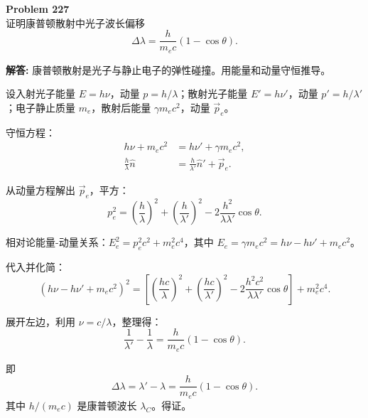 \documentclass[12pt, a4paper, oneside]{ctexart}
\newenvironment{solution}{\par\noindent\textbf{解答:}\quad}{\par}
\begin{document}
\begin{mdframed}[backgroundcolor=gray!10, linewidth=0pt]
    \textbf{Problem 227} \\
    证明康普顿散射中光子波长偏移
    \[
    \Delta\lambda = \frac{h}{m_e c} (1 - \cos\theta).
    \]
\end{mdframed}
\begin{solution}
    康普顿散射是光子与静止电子的弹性碰撞。用能量和动量守恒推导。
    
    设入射光子能量 $E = h\nu$，动量 $p = h/\lambda$；散射光子能量 $E' = h\nu'$，动量 $p' = h/\lambda'$；电子静止质量 $m_e$，散射后能量 $\gamma m_e c^2$，动量 $\vec{p}_e$。
    
    守恒方程：
    \begin{align}
        h\nu + m_e c^2 &= h\nu' + \gamma m_e c^2, \\
        \frac{h}{\lambda} \hat{n} &= \frac{h}{\lambda'} \hat{n}' + \vec{p}_e.
    \end{align}
    
    从动量方程解出 $\vec{p}_e$，平方：
    \[
    p_e^2 = \left( \frac{h}{\lambda} \right)^2 + \left( \frac{h}{\lambda'} \right)^2 - 2 \frac{h^2}{\lambda\lambda'} \cos\theta.
    \]
    
    相对论能量-动量关系：$E_e^2 = p_e^2 c^2 + m_e^2 c^4$，其中 $E_e = \gamma m_e c^2 = h\nu - h\nu' + m_e c^2$。
    
    代入并化简：
    \[
    (h\nu - h\nu' + m_e c^2)^2 = \left[ \left( \frac{hc}{\lambda} \right)^2 + \left( \frac{hc}{\lambda'} \right)^2 - 2 \frac{h^2 c^2}{\lambda\lambda'} \cos\theta \right] + m_e^2 c^4.
    \]
    
    展开左边，利用 $\nu = c/\lambda$，整理得：
    \[
    \frac{1}{\lambda'} - \frac{1}{\lambda} = \frac{h}{m_e c} (1 - \cos\theta).
    \]
    
    即
    \[
    \Delta\lambda = \lambda' - \lambda = \frac{h}{m_e c} (1 - \cos\theta).
    \]
    其中 $h/(m_e c)$ 是康普顿波长 $\lambda_C$。得证。
\end{solution}
\end{document}
